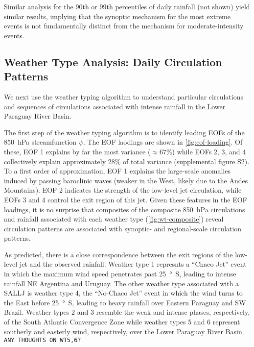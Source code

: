 \documentclass[twocol]{ametsoc}
\begin{document}
Similar analysis for the 90th or 99th percentiles of daily rainfall (not shown) yield similar results, implying that the synoptic mechanism for the most extreme events is not fundamentally distinct from the mechanism for moderate-intensity events.

\subsection{Weather Type Analysis: Daily Circulation Patterns} \label{sec:weather-types}

We next use the weather typing algorithm to understand particular circulations and sequences of circulations associated with intense rainfall in the Lower Paraguay River Basin.

The first step of the weather typing algorithm is to identify leading EOFs of the \SI{850}{\hecto\pascal} streamfunction $\psi$.
The EOF laodings are shown in \cref{fig:eof-loading}.
Of these, EOF 1 explains by far the most variance ($\approx 67\%$) while EOFs 2, 3, and 4 collectively explain approximately $28\%$ of total variance (supplemental figure S2).
To a first order of approximation, EOF 1 explains the large-scale anomalies induced by passing baroclinic waves (weaker in the West, likely due to the Andes Mountains).
EOF 2 indicates the strength of the low-level jet circulation, while EOFs 3 and 4 control the exit region of this jet.
Given these features in the EOF loadings, it is no surprise that composites of the composite \SI{850}{\hecto\pascal} circulations and rainfall associated with each weather type (\cref{fig:wt-composite}) reveal circulation patterns are associated with synoptic- and regional-scale circulation patterns.

As predicted, there is a close correspondence between the exit regions of the low-level jet and the observed rainfall.
Weather type 1 represnts a ``Chaco Jet'' event \citep{Salio:2002ev} in which the maximum wind speed penetrates past \SI{25}{\degree S}, leading to intense rainfall NE Argentina and Uruguay.
The other weather type associated with a SALLJ is weather type 4, the ``No-Chaco Jet'' event in which the wind turns to the East before \SI{25}{\degree S}, leading to heavy rainfall over Eastern Paraguay and SW Brazil.
Weather types 2 and 3 resemble the weak and intense phases, respectively, of the South Atlantic Convergence Zone \citep[SACZ;][]{Carvalho2004} while weather types 5 and 6 represent southerly and easterly wind, respectively, over the Lower Paraguay River Basin.
\texttt{ANY THOUGHTS ON WT5,6?}
\end{document}
